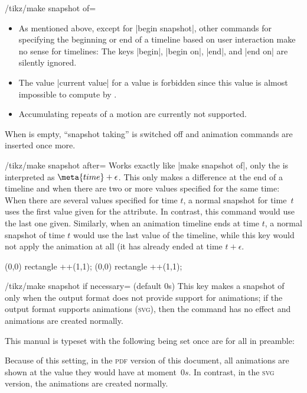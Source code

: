 \begin{key}{/tikz/make snapshot of=}
  \begin{itemize}
  \item As mentioned above, except for |begin snapshot|, other
    commands for specifying the beginning or end of a timeline based
    on user interaction make no sense for timelines: The keys |begin|,
    |begin on|, |end|, and |end on| are silently ignored.
  \item The value |current value| for a value is forbidden since this
    value is almost impossible to compute by \tikzname.
  \item Accumulating repeats of a motion are currently not supported. 
  \end{itemize}
  
  When  is empty, ``snapshot taking'' is switched off and
  animation commands are inserted once more.
\end{key}


\begin{key}{/tikz/make snapshot after=}
  Works exactly like |make snapshot of|, only the  is
  interpreted as $\meta{time} + \epsilon$. This only makes a
  difference at the end of a timeline and when there are two or more
  values specified for the same time: When there are several values
  specified for time $t$, a normal snapshot for time~$t$ uses the
  first value given for the attribute. In contrast, this command would
  use the last one given. Similarly, when an animation timeline ends
  at time $t$, a normal snapshot of time $t$ would use the last
  value of the timeline, while this key would not apply the animation
  at all (it has already ended at time $t + \epsilon$.
  
\begin{codeexample}[]
\tikz [make snapshot of = 2s] 
  \fill [animate me = { :fill = { 0s = "green", 2s = "red" } }]
    (0,0) rectangle ++(1,1);
\tikz [make snapshot after = 2s] 
  \fill [animate me = { :fill = { 0s = "green", 2s = "red" } }]
    (0,0) rectangle ++(1,1);
\end{codeexample}
\end{key}


\begin{key}{/tikz/make snapshot if necessary= (default 0s)}
  This key makes a snapshot of  only when the output format
  does not provide support for animations; if the output format
  supports animations (\textsc{svg}), then the command has
  no effect and animations are created normally.

  This manual is typeset with the following being set once are for all
  in preamble:
\begin{codeexample}
\tikzset{make snapshot if necessary}    
\end{codeexample}

  Because of this setting, in the \textsc{pdf} version of this
  document, all animations are shown at the value they would have at
  moment~$0s$. In contrast, in the \textsc{svg} version, the
  animations are created normally.
\end{key}


